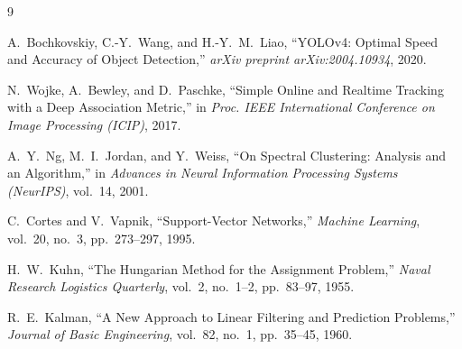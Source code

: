 \documentclass[12pt,a4paper]{article}
\begin{document}
\newpage
\begin{thebibliography}{9}

A.~Bochkovskiy, C.-Y.~Wang, and H.-Y.~M.~Liao,
``YOLOv4: Optimal Speed and Accuracy of Object Detection,''
\textit{arXiv preprint arXiv:2004.10934}, 2020.

N.~Wojke, A.~Bewley, and D.~Paschke,
``Simple Online and Realtime Tracking with a Deep Association Metric,''
in \textit{Proc. IEEE International Conference on Image Processing (ICIP)}, 2017.

A.~Y.~Ng, M.~I.~Jordan, and Y.~Weiss,
``On Spectral Clustering: Analysis and an Algorithm,''
in \textit{Advances in Neural Information Processing Systems (NeurIPS)}, vol.~14, 2001.

C.~Cortes and V.~Vapnik,
``Support-Vector Networks,''
\textit{Machine Learning}, vol.~20, no.~3, pp.~273--297, 1995.

H.~W.~Kuhn,
``The Hungarian Method for the Assignment Problem,''
\textit{Naval Research Logistics Quarterly}, vol.~2, no.~1--2, pp.~83--97, 1955.

R.~E.~Kalman,
``A New Approach to Linear Filtering and Prediction Problems,''
\textit{Journal of Basic Engineering}, vol.~82, no.~1, pp.~35--45, 1960.

\end{thebibliography}
\end{document}
